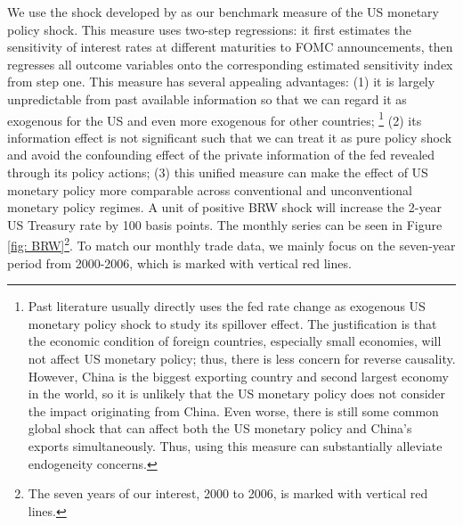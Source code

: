 We use the shock developed by \cite{bu2021unified} as our benchmark measure of the US monetary policy shock. This measure uses \cite{fama1973risk} two-step regressions: it first estimates the sensitivity of interest rates at different maturities to FOMC announcements, then regresses all outcome variables onto the corresponding estimated sensitivity index from step one. This measure has several appealing advantages: (1) it is largely unpredictable from past available information so that we can regard it as exogenous for the US and even more exogenous for other countries; \footnote{Past literature usually directly uses the fed rate change as exogenous US monetary policy shock to study its spillover effect. The justification is that the economic condition of foreign countries, especially small economies, will not affect US monetary policy; thus, there is less concern for reverse causality. However, China is the biggest exporting country and second largest economy in the world, so it is unlikely that the US monetary policy does not consider the impact originating from China. Even worse, there is still some common global shock that can affect both the US monetary policy and China's exports simultaneously. Thus, using this measure can substantially alleviate endogeneity concerns.} (2) its information effect is not significant such that we can treat it as pure policy shock and avoid the confounding effect of the private information of the fed revealed through its policy actions; (3) this unified measure can make the effect of US monetary policy more comparable across conventional and unconventional monetary policy regimes. A unit of positive BRW shock will increase the 2-year US Treasury rate by 100 basis points. The monthly series can be seen in Figure \ref{fig: BRW}\footnote{The seven years of our interest, 2000 to 2006, is marked with vertical red lines.}. To match our monthly trade data, we mainly focus on the seven-year period from 2000-2006, which is marked with vertical red lines.

